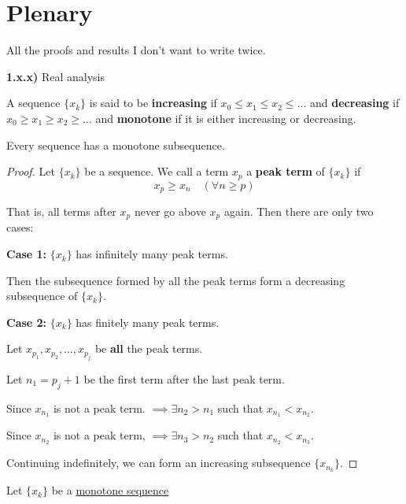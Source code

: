 
\section{Plenary}\label{80eeafc}

All the proofs and results I don't want to write twice.

\textbf{1.x.x)} Real analysis

\label{d5142a8}

A sequence $\{x_k\}$ is said to be \textbf{increasing} if $x_0\leq
	x_1\leq x_2\leq\ldots$ and \textbf{decreasing} if $x_0\geq x_1\geq
	x_2\geq\ldots$ and \textbf{monotone} if it is either increasing or
decreasing.

\label{dddb70e}

Every sequence has a monotone subsequence.

\begin{proof}
	\def\xk{\{x_k\}}

	Let $\xk$ be a sequence. We call a term $x_p$ a \textbf{peak term}
	of $\xk$ if
	$$x_p\geq x_n\quad(\forall n\geq p)$$

  That is, all terms after $x_p$ never go above $x_p$ again. Then
  there are only two cases:

  \textbf{Case 1:} $\xk$ has infinitely many peak terms.

  Then the subsequence formed by all the peak terms form a decreasing
  subsequence of $\xk$.

  \textbf{Case 2:} $\xk$ has finitely many peak terms.

  Let $x_{p_1},x_{p_2},\ldots,x_{p_j}$ be \textbf{all} the peak terms.

  Let $n_1=p_j+1$ be the first term after the last peak term.

  Since $x_{n_1}$ is not a peak term. $\implies\exists n_2>n_1$ such
  that $x_{n_1}<x_{n_2}$.

  Since $x_{n_2}$ is not a peak term, $\implies\exists n_3>n_2$ such
  that $x_{n_2}<x_{n_3}$.

  Continuing indefinitely, we can form an increasing subsequence
  $\{x_{n_k}\}$.
\end{proof}


Let $\{x_k\}$ be a \hyperref[d5142a8]{monotone sequence}
